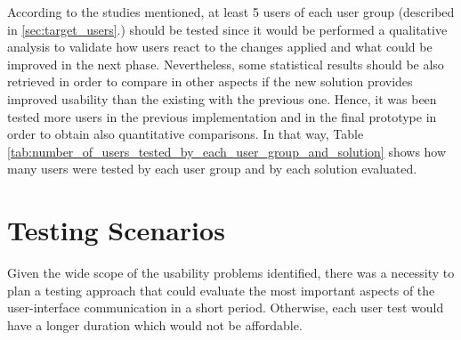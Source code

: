 According to the studies mentioned, at least 5 users of each user group (described in \ref{sec:target_users}.) should be tested since it would be performed a qualitative analysis to validate how users react to the changes applied and what could be improved in the next phase. Nevertheless, some statistical results should be also retrieved in order to compare in other aspects if the new solution provides improved usability than the existing with the previous one. Hence, it was been tested more users in the previous implementation and in the final prototype in order to obtain also quantitative comparisons. In that way, Table \ref{tab:number_of_users_tested_by_each_user_group_and_solution} shows how many users were tested by each user group and by each solution evaluated.

\begin{table}[tb]
	\caption{Number of users tested by each user group and by each solution evaluated}
	\label{tab:number_of_users_tested_by_each_user_group_and_solution}
\centering
{}
\end{table}


\section{Testing Scenarios}
\label{sec:testing_scenarios}
Given the wide scope of the usability problems identified, there was a necessity to plan a testing approach that could evaluate the most important aspects of the user-interface communication in a short period. Otherwise, each user test would have a longer duration which would not be affordable.

